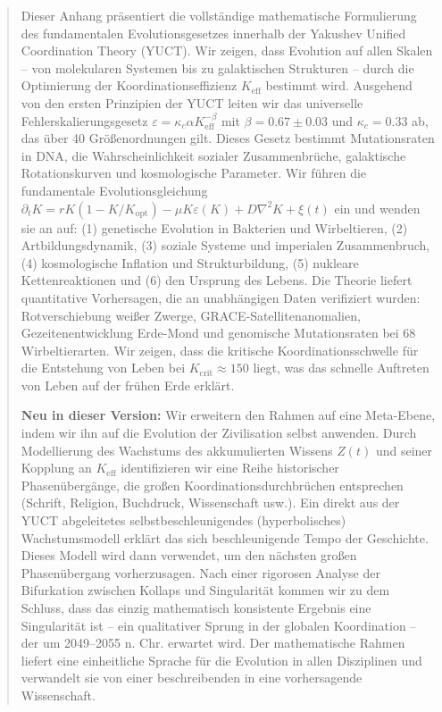\documentclass[12pt,a4paper]{article}
\theoremstyle{remark}
\newcommand{\Keff}{K_{\mathrm{eff}}}
\newcommand{\kappac}{\kappa_c}
\newcommand{\eps}{\varepsilon}
\begin{document}
\begin{titlepage}
\begin{center}
			\begin{minipage}{0.9\textwidth}
				\begin{abstract}
					\noindent
					Dieser Anhang präsentiert die vollständige mathematische Formulierung des fundamentalen Evolutionsgesetzes innerhalb der Yakushev Unified Coordination Theory (YUCT). Wir zeigen, dass Evolution auf allen Skalen – von molekularen Systemen bis zu galaktischen Strukturen – durch die Optimierung der Koordinationseffizienz $\Keff$ bestimmt wird. Ausgehend von den ersten Prinzipien der YUCT leiten wir das universelle Fehlerskalierungsgesetz $\eps = \kappac \alpha \Keff^{-\beta}$ mit $\beta = 0.67 \pm 0.03$ und $\kappac = 0.33$ ab, das über 40 Größenordnungen gilt. Dieses Gesetz bestimmt Mutationsraten in DNA, die Wahrscheinlichkeit sozialer Zusammenbrüche, galaktische Rotationskurven und kosmologische Parameter. Wir führen die fundamentale Evolutionsgleichung $\partial_t K = rK(1-K/K_{\mathrm{opt}}) - \mu K \eps(K) + D\nabla^2 K + \xi(t)$ ein und wenden sie an auf: (1) genetische Evolution in Bakterien und Wirbeltieren, (2) Artbildungsdynamik, (3) soziale Systeme und imperialen Zusammenbruch, (4) kosmologische Inflation und Strukturbildung, (5) nukleare Kettenreaktionen und (6) den Ursprung des Lebens. Die Theorie liefert quantitative Vorhersagen, die an unabhängigen Daten verifiziert wurden: Rotverschiebung weißer Zwerge, GRACE-Satellitenanomalien, Gezeitenentwicklung Erde-Mond und genomische Mutationsraten bei 68 Wirbeltierarten. Wir zeigen, dass die kritische Koordinationsschwelle für die Entstehung von Leben bei $K_{\mathrm{crit}} \approx 150$ liegt, was das schnelle Auftreten von Leben auf der frühen Erde erklärt.
					
					\noindent
					\textbf{Neu in dieser Version:} Wir erweitern den Rahmen auf eine Meta-Ebene, indem wir ihn auf die Evolution der Zivilisation selbst anwenden. Durch Modellierung des Wachstums des akkumulierten Wissens $Z(t)$ und seiner Kopplung an $K_{\text{eff}}$ identifizieren wir eine Reihe historischer Phasenübergänge, die großen Koordinationsdurchbrüchen entsprechen (Schrift, Religion, Buchdruck, Wissenschaft usw.). Ein direkt aus der YUCT abgeleitetes selbstbeschleunigendes (hyperbolisches) Wachstumsmodell erklärt das sich beschleunigende Tempo der Geschichte. Dieses Modell wird dann verwendet, um den nächsten großen Phasenübergang vorherzusagen. Nach einer rigorosen Analyse der Bifurkation zwischen Kollaps und Singularität kommen wir zu dem Schluss, dass das einzig mathematisch konsistente Ergebnis eine Singularität ist – ein qualitativer Sprung in der globalen Koordination – der um 2049–2055 n. Chr. erwartet wird. Der mathematische Rahmen liefert eine einheitliche Sprache für die Evolution in allen Disziplinen und verwandelt sie von einer beschreibenden in eine vorhersagende Wissenschaft.
				\end{abstract}
			\end{minipage}
			

\end{center}
\end{titlepage}
\end{document}

